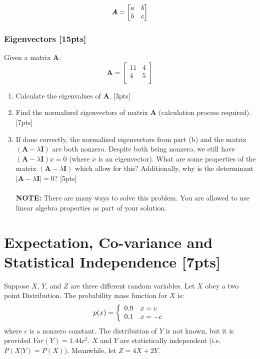 \documentclass{article}
\begin{document}
$$\textbf{\textit{A}}=\begin{bmatrix}
    a & b \\
    b & c
\end{bmatrix}$$


\subsubsection{Eigenvectors [15pts]}
Given a matrix $\boldsymbol{A}$:
$$\boldsymbol{A} = \begin{bmatrix} 
    11 & 4  \\ 
    4 & 5 \\
\end{bmatrix}$$
\begin{enumerate}[label=(\alph*)]
    \item Calculate the eigenvalues of $\boldsymbol{A}$. [3pts]
    \item Find the normalized eigenvectors of matrix $\boldsymbol{A}$ (calculation process required). [7pts]
    \item If done correctly, the normalized eigenvectors from part (b) and the matrix $(\boldsymbol{A} - \lambda \boldsymbol{I} )$ are both nonzero. Despite both being nonzero, we still have $(\boldsymbol{A} - \lambda \boldsymbol{I} )x = 0$ (where $x$ is an eigenvector). What are some properties of the matrix $(\boldsymbol{A} - \lambda \boldsymbol{I} )$ which allow for this? Additionally, why is the determinant $|\boldsymbol{A}-\lambda \boldsymbol{I}|= 0$? [5pts]\\\\
    \textbf{NOTE:} There are many ways to solve this problem. You are allowed to use linear algebra properties as part of your solution. \\
\end{enumerate}
\newpage



\section{Expectation, Co-variance and Statistical Independence [7pts]}

Suppose $X$, $Y$, and $Z$ are three different random variables.
Let $X$ obey a two point Distribution. The probability mass function for $X$ is:
    $$p(x)=\left\{
    \begin{array}{ c l}	
        0.9 & x = c\\
        0.1 & x = -c
    \end{array}\right.$$
where $c$ is a nonzero constant. The distribution of $Y$ is not known, but it is provided $Var(Y) = 1.44c^2$. $X$ and $Y$ are statistically independent (i.e. $P(X|Y) = P(X)$). Meanwhile, let $Z = 4X + 2Y$. \\
\end{document}
